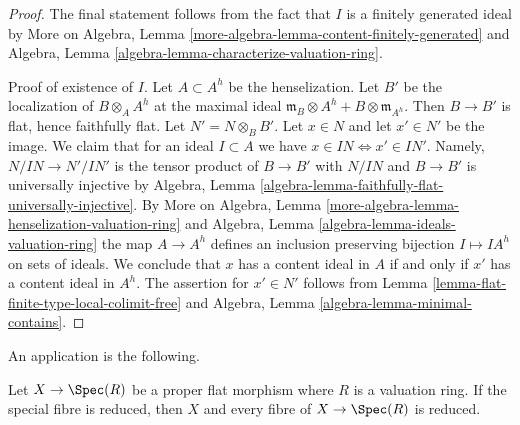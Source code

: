 \begin{proof}
The final statement follows from the fact that $I$ is a finitely
generated ideal by
More on Algebra, Lemma \ref{more-algebra-lemma-content-finitely-generated}
and Algebra, Lemma \ref{algebra-lemma-characterize-valuation-ring}.

\medskip\noindent
Proof of existence of $I$.
Let $A \subset A^h$ be the henselization. Let $B'$ be the localization
of $B \otimes_A A^h$ at the maximal ideal
$\mathfrak m_B \otimes A^h + B \otimes \mathfrak m_{A^h}$.
Then $B \to B'$ is flat, hence faithfully flat.
Let $N' = N \otimes_B B'$.
Let $x \in N$ and let $x' \in N'$ be the image.
We claim that for an ideal $I \subset A$ we have
$x \in IN \Leftrightarrow x' \in IN'$.
Namely, $N/IN \to N'/IN'$ is the tensor product of $B \to B'$
with $N/IN$ and $B \to B'$ is universally injective by
Algebra, Lemma \ref{algebra-lemma-faithfully-flat-universally-injective}.
By More on Algebra, Lemma \ref{more-algebra-lemma-henselization-valuation-ring}
and Algebra, Lemma \ref{algebra-lemma-ideals-valuation-ring}
the map $A \to A^h$ defines an inclusion preserving
bijection $I \mapsto IA^h$ on sets of ideals. We conclude that
$x$ has a content ideal in $A$ if and only if $x'$ has a content
ideal in $A^h$. The assertion for $x' \in N'$ follows from
Lemma \ref{lemma-flat-finite-type-local-colimit-free} and
Algebra, Lemma \ref{algebra-lemma-minimal-contains}.
\end{proof}

\noindent
An application is the following.

\begin{lemma}
\label{lemma-proper-flat-over-dvr-reduced-fibre}
Let $X \to \Spec(R)$ be a proper flat morphism where $R$ is a valuation ring.
If the special fibre is reduced, then $X$ and every fibre of $X \to \Spec(R)$
is reduced.
\end{lemma}


